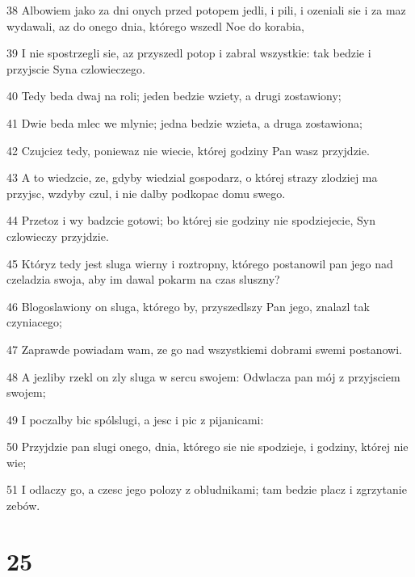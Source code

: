 \par 38 Albowiem jako za dni onych przed potopem jedli, i pili, i ozeniali sie i za maz wydawali, az do onego dnia, którego wszedl Noe do korabia,
\par 39 I nie spostrzegli sie, az przyszedl potop i zabral wszystkie: tak bedzie i przyjscie Syna czlowieczego.
\par 40 Tedy beda dwaj na roli; jeden bedzie wziety, a drugi zostawiony;
\par 41 Dwie beda mlec we mlynie; jedna bedzie wzieta, a druga zostawiona;
\par 42 Czujciez tedy, poniewaz nie wiecie, której godziny Pan wasz przyjdzie.
\par 43 A to wiedzcie, ze, gdyby wiedzial gospodarz, o której strazy zlodziej ma przyjsc, wzdyby czul, i nie dalby podkopac domu swego.
\par 44 Przetoz i wy badzcie gotowi; bo której sie godziny nie spodziejecie, Syn czlowieczy przyjdzie.
\par 45 Któryz tedy jest sluga wierny i roztropny, którego postanowil pan jego nad czeladzia swoja, aby im dawal pokarm na czas sluszny?
\par 46 Blogoslawiony on sluga, którego by, przyszedlszy Pan jego, znalazl tak czyniacego;
\par 47 Zaprawde powiadam wam, ze go nad wszystkiemi dobrami swemi postanowi.
\par 48 A jezliby rzekl on zly sluga w sercu swojem: Odwlacza pan mój z przyjsciem swojem;
\par 49 I poczalby bic spólslugi, a jesc i pic z pijanicami:
\par 50 Przyjdzie pan slugi onego, dnia, którego sie nie spodzieje, i godziny, której nie wie;
\par 51 I odlaczy go, a czesc jego polozy z obludnikami; tam bedzie placz i zgrzytanie zebów.

\chapter{25}


